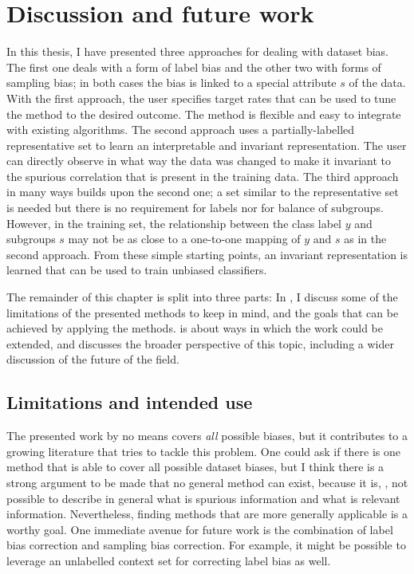 \chapter{Discussion and future work}\label{ch:conclusion} In this thesis, I have presented three
approaches for dealing with dataset bias. The first one deals with a form of label bias and the
other two with forms of sampling bias; in both cases the bias is linked to a special attribute
\(s\) of the data.
%
%
With the first approach, the user specifies target rates that can be used to tune the method to the
desired outcome. The method is flexible and easy to integrate with existing algorithms. The second
approach uses a partially-labelled representative set to learn an interpretable and invariant
representation. The user can directly observe in what way the data was changed to make it invariant
to the spurious correlation that is present in the training data. The third approach in many ways
builds upon the second one; a set similar to the representative set is needed but there is no
requirement for labels nor for balance of subgroups. However, in the training set, the relationship
between the class label \(y\) and subgroups \(s\) may not be as close to a one-to-one mapping of
\(y\) and \(s\) as in the second approach. From these simple starting points, an invariant
representation is learned that can be used to train unbiased classifiers.

The remainder of this chapter is split into three parts: In , I discuss
some of the limitations of the presented methods to keep in mind, and the goals that can be
achieved by applying the methods.  is about ways in which the work
could be extended, and  discusses the broader perspective of this
topic, including a wider discussion of the future of the field.

\section{Limitations and intended use}\label{sec:ch7-limitations}
%
The presented work by no means covers \emph{all} possible biases, but it contributes to a growing
literature that tries to tackle this problem. One could ask if there is one method that is able to
cover all possible dataset biases, but I think there is a strong argument to be made that no
general method can exist, because it is, \eg, not possible to describe in general what is spurious
information and what is relevant information. Nevertheless, finding methods that are more generally
applicable is a worthy goal. One immediate avenue for future work is the combination of label bias
correction and sampling bias correction. For example, it might be possible to leverage an
unlabelled context set for correcting label bias as well.

